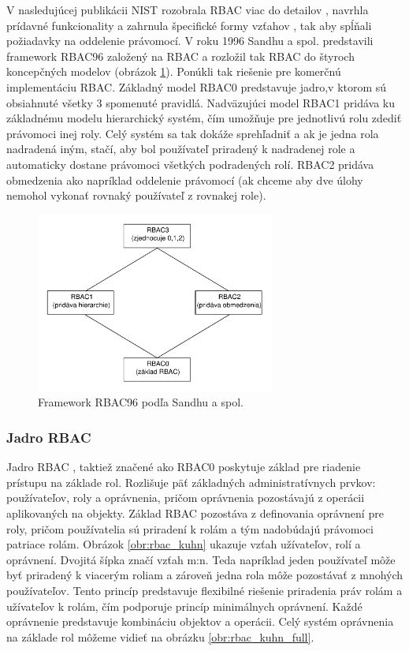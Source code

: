 V nasledujúcej publikácii \cite{NIST95} NIST rozobrala RBAC viac do detailov , navrhla prídavné funkcionality a zahrnula špecifické formy vzťahov , tak aby spĺňali požiadavky na oddelenie právomocí. V roku 1996 Sandhu a spol. \cite{sandhu96} predstavili framework RBAC96 založený na RBAC a rozložil tak RBAC do štyroch koncepčných modelov (obrázok \ref{obr:roly_rbac0_rbac1}). Ponúkli tak riešenie pre komerčnú implementáciu RBAC.
Základný model RBAC0 predstavuje jadro,v ktorom sú obsiahnuté všetky 3 spomenuté pravidlá. Nadväzujúci model RBAC1 pridáva ku základnému modelu hierarchický systém, čím umožňuje pre jednotlivú rolu zdediť právomoci inej roly. Celý systém sa tak dokáže sprehľadniť a ak je jedna rola nadradená iným, stačí, aby bol používateľ priradený k nadradenej role a automaticky dostane právomoci všetkých podradených rolí. RBAC2 pridáva obmedzenia ako napríklad oddelenie právomocí (ak chceme aby dve úlohy nemohol vykonať rovnaký používateľ z rovnakej role). 

\begin{figure}[H]
	\centerline{\includegraphics[width=0.7\textwidth]{images/rbac012}}
	\caption{Framework RBAC96 podľa Sandhu a spol. \cite{sandhu96}}
	\label{obr:roly_rbac0_rbac1}
\end{figure}



\subsubsection{Jadro RBAC}
Jadro RBAC , taktiež značené ako RBAC0 poskytuje základ pre riadenie prístupu na základe rol. Rozlišuje päť základných administratívnych prvkov: používateľov, roly a oprávnenia, pričom oprávnenia pozostávajú z operácii aplikovaných na objekty. Základ RBAC pozostáva z definovania oprávnení pre roly, pričom používatelia sú priradení k rolám a tým nadobúdajú právomoci patriace rolám. Obrázok \ref{obr:rbac_kuhn} ukazuje vzťah užívateľov, rolí a oprávnení. Dvojitá šípka značí vzťah m:n. Teda napríklad jeden používateľ môže byť priradený k viacerým roliam a zároveň jedna rola môže pozostávať z mnohých používateľov. Tento princíp predstavuje flexibilné riešenie priradenia práv rolám a užívateľov k rolám, čím podporuje princíp minimálnych oprávnení. Každé oprávnenie predstavuje kombináciu objektov a operácii. Celý systém oprávnenia na základe rol môžeme vidieť na obrázku \ref{obr:rbac_kuhn_full}.




